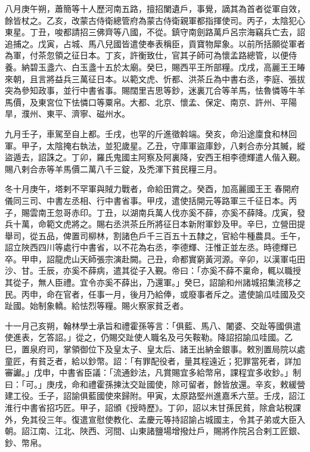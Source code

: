 \begin{pinyinscope}
 八月庚午朔，蕭簡等十人歷河南五路，擅招闌遺戶，事覺，謫其為首者從軍自效，餘皆杖之。乙亥，改蒙古侍衛總管府為蒙古侍衛親軍都指揮使司。丙子，太陰犯心東星。丁丑，唆都請招三佛齊等八國，不從。鎮守南劍路萬戶呂宗海竊兵亡去，詔追捕之。戊寅，占城、馬八兒國皆遣使奉表稱臣，貢寶物犀象。以前所括願從軍者為軍，付茶忽領之征日本。丁亥，許衡致仕，官其子師可為懷孟路總管，以便侍養。納碧玉盞六、白玉盞十五於太廟。癸巳，賜西平王所部糧。戊戌，高麗王王睶來朝，且言將益兵三萬征日本。以範文虎、忻都、洪茶丘為中書右丞，李庭、張拔突為參知政事，並行中書省事。賜闊里吉思等鈔，迷裏兀合等羊馬，怯魯憐等牛羊馬價，及東宮位下怯憐口等粟帛。大都、北京、懷孟、保定、南京、許州、平陽旱，濮州、東平、濟寧、磁州水。



 九月壬子，車駕至自上都。壬戌，也罕的斤進徵斡端。癸亥，命沿途廩食和林回軍。甲子，太陰掩右執法，並犯歲星。乙丑，守庫軍盜庫鈔，八剌合赤分其贓，縱盜遁去，詔誅之。丁卯，羅氏鬼國主阿察及阿裏降，安西王相李德輝遣人偕入覲。賜八剌合赤等羊馬價二萬八千三錠，及禿渾下貧民糧三月。



 冬十月庚午，塔剌不罕軍與賊力戰者，命給田賞之。癸酉，加高麗國王王春開府儀同三司、中書左丞相、行中書省事。甲戌，遣使括開元等路軍三千征日本。丙子，賜雲南王忽哥赤印。丁丑，以湖南兵萬人伐亦奚不薛，亦奚不薛降。戊寅，發兵十萬，命範文虎將之。賜右丞洪茶丘所將征日本新附軍鈔及甲。辛巳，立營田提舉司，從五品，俾置司柳林，割諸色戶千三百五十五隸之，官給牛種農具。壬午，詔立陜西四川等處行中書省，以不花為右丞，李德輝、汪惟正並左丞。時德輝已卒。甲申，詔龍虎山天師張宗演赴闕。己丑，命都實窮黃河源。辛卯，以漢軍屯田沙、甘。壬辰，亦奚不薛病，遣其從子入覲。帝曰：「亦奚不薛不稟命，輒以職授其從子，無人臣禮。宜令亦奚不薛出，乃還軍。」癸巳，詔諭和州諸城招集流移之民。丙申，命在官者，任事一月，後月乃給俸，或廢事者斥之。遣使諭瓜哇國及交趾國。始制象轎。給怯烈等糧。賜火察家貧乏者。



 十一月己亥朔，翰林學士承旨和禮霍孫等言：「俱藍、馬八、闍婆、交趾等國俱遣使進表，乞答詔。」從之，仍賜交趾使人職名及弓矢鞍勒。降詔招諭瓜哇國。乙巳，置泉府司，掌領御位下及皇太子、皇太后、諸王出納金銀事。敕別置局院以處童匠，有貧乏者，給以鈔幣。詔：「有罪配役者，量其程遠近；犯罪當死者，詳加審讞。」戊申，中書省臣議：「流通鈔法，凡賞賜宜多給幣帛，課程宜多收鈔。」制曰：「可。」庚戌，命和禮霍孫揀汰交趾國使，除可留者，餘皆放還。辛亥，敕緩營建工役。壬子，詔諭俱藍國使來歸附。甲寅，太原路堅州進嘉禾六莖。壬戌，詔江淮行中書省招巧匠。甲子，詔頒《授時歷》。丁卯，詔以末甘孫民貧，除倉站稅課外，免其役三年。復遣宣慰使教化、孟慶元等持詔諭占城國主，令其子弟或大臣入朝。詔江南、江北、陜西、河間、山東諸鹽場增撥灶戶，賜將作院呂合剌工匠銀、鈔、幣帛。




\end{pinyinscope}

